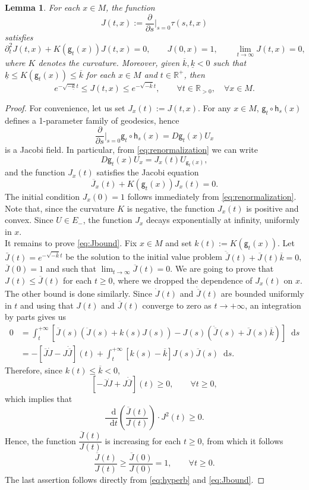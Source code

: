 \documentclass[11pt,letterpaper]{amsart}
\newcommand \R {{ \mathbb R}}
\newcommand{\horo}{\mathsf{h}}
\newcommand{\geo}{\mathsf{g}}
\newcommand*{\diff}{\mathop{}\!\mathrm{d}}
\newtheorem {lemma}[theorem]{Lemma}
\theoremstyle{definition}
\begin{document}
\begin{lemma}\label{lemma:Jacobi}
For each $x\in M$, the function
\[
J(t,x) := \frac{\partial}{\partial s}\Big\vert_{s=0} \tau(s,t,x)
\]
satisfies
\[
\partial^2_{t}{J}(t,x) + K(\geo_t(x))J(t,x) =0, \qquad J(0,x)=1, \qquad \lim_{t \to \infty} J(t,x) = 0,
\]
where $K$ denotes the curvature. Moreover, given $\overline k, \underline k<0$ such that $\underline k \leq K(\geo_t(x)) \leq \overline k$ for each $x\in M$ and $t\in \R^+$, then
\begin{equation}\label{eq:Jbound}
e^{-\sqrt{-\underline k}t} \le J(t,x) \le e^{-\sqrt{-\overline k}t}, \qquad \forall t\in \R_{>0}, \quad \forall x\in M.
\end{equation}
\end{lemma}
\begin{proof}
For convenience, let us set $J_x(t):=J(t,x)$. For any $x \in M$, $\geo_t \circ \horo_s(x)$ defines a 1-parameter family of geodesics, hence 
\[
\frac{\partial}{\partial s}\Big\vert_{s=0} \geo_t \circ \horo_s(x) = D\geo_t(x) U_x
\]
is a Jacobi field. In particular, from \eqref{eq:renormalization} we can write
\[
D\geo_t(x) U_x = J_x(t) U_{\geo_t(x)},
\]
and the function $J_x(t)$ satisfies the Jacobi equation \cite[Chapter 5]{doCarmo}
\[
\ddot{J_x}(t) + K(\geo_t(x))J_x(t) =0.
\]
The initial condition $J_x(0)=1$ follows immediately from \eqref{eq:renormalization}.
Note that, since the curvature $K$ is negative, the function $J_x(t)$ is positive and convex. Since $U \in E_{-}$, the function $J_x$ decays exponentially at infinity, uniformly in $x$. \\
It remains to prove \eqref{eq:Jbound}. Fix $x\in M$ and set $k(t):=K(\geo_t(x))$. Let $\bar J(t)=e^{-\sqrt{-\bar k}t}$ be the solution to the initial value problem $\ddot{\overline J}(t)+ \overline J(t)\overline k=0$, $\overline J(0)=1$ and such that $\lim_{t\to \infty} \overline J(t)=0$. We are going to prove that $J(t)\le \overline J(t)$ for each $t \ge 0$, where we dropped the dependence of $J_x(t)$ on $x$. The other bound is done similarly. Since $\dot J(t)$ and $\dot{\overline J}(t)$ are bounded uniformly in $t$ and using that $J(t)$ and $\overline J(t)$ converge to zero as $t \to +\infty$, an integration by parts gives us
\[
\begin{split}
0&=\int_t^{+\infty} [\overline J(s)(\ddot J(s)+k(s)J(s))-J(s)(\ddot{\overline J}(s)+ \overline J(s)\overline k)]\diff s\\
&=-[\overline J \dot J-J \dot{\overline J}](t)+\int_t^{+\infty}[k(s)-\overline k]J(s)\overline J(s) \diff s.
\end{split}
\]
Therefore, since $k(t)\le \overline k<0$, 
\[
[-\overline J \dot J+J \dot{\overline J}](t) \ge 0,\qquad  \forall t \ge 0,
\]
which implies that
\[
\dfrac{\diff}{\diff t} \left( \frac{\overline J(t)}{J(t)} \right) \cdot J^2(t) \ge 0.
\]
Hence, the function $ \dfrac{\overline J(t)}{J(t)} $ is increasing for each $t \ge 0$, from which it follows
\[
 \frac{\overline J(t)}{J(t)}  \ge \frac{\overline J(0)}{J(0)}=1, \qquad \forall t \ge 0.
\]
The last assertion follows directly from \eqref{eq:hyperb} and \eqref{eq:Jbound}.
\end{proof}
\end{document}
